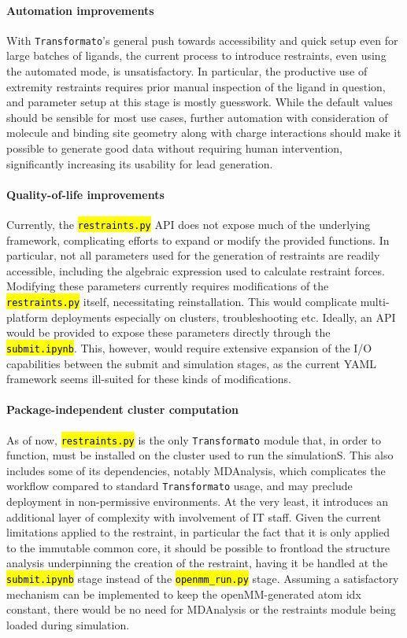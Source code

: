 \documentclass[oneside]{scrreprt}
\newcommand{\code}[1]{\texttt{\hl{#1}}}
\begin{document}
\paragraph{Automation improvements} With \texttt{Transformato}'s general push towards accessibility and quick setup even for large batches of ligands, the current process to introduce restraints, even using the automated mode, is unsatisfactory. In particular, the productive use of extremity restraints requires prior manual inspection of the ligand in question, and parameter setup at this stage is mostly guesswork. While the default values should be sensible for most use cases, further automation with consideration of molecule and binding site geometry along with charge interactions should make it possible to generate good data without requiring human intervention, significantly increasing its usability for lead generation.
\paragraph{Quality-of-life improvements} Currently, the \code{restraints.py} API does not expose much of the underlying framework, complicating efforts to expand or modify the provided functions. In particular, not all parameters used for the generation of restraints are readily accessible, including the algebraic expression used to calculate restraint forces. Modifying these parameters currently requires modifications of the \code{restraints.py} itself, necessitating reinstallation. This would complicate multi-platform deployments especially on clusters, troubleshooting etc. Ideally, an API would be provided to expose these parameters directly through the \code{submit.ipynb}. This, however, would require extensive expansion of the I/O capabilities between the submit and simulation stages, as the current YAML framework seems ill-suited for these kinds of modifications.
\paragraph{Package-independent cluster computation} As of now, \code{restraints.py} is the only \texttt{Transformato} module that, in order to function, must be installed on the cluster used to run the simulationS. This also includes some of its dependencies, notably MDAnalysis, which complicates the workflow compared to standard \texttt{Transformato} usage, and may preclude deployment in non-permissive environments. At the very least, it introduces an additional layer of complexity with involvement of IT staff. Given the current limitations applied to the restraint, in particular the fact that it is only applied to the immutable common core, it should be possible to frontload the structure analysis underpinning the creation of the restraint, having it be handled at the \code{submit.ipynb} stage instead of the \code{openmm\_run.py} stage. Assuming a satisfactory mechanism can be implemented to keep the openMM-generated atom idx constant, there would be no need for MDAnalysis or the restraints module being loaded during simulation.
\end{document}
